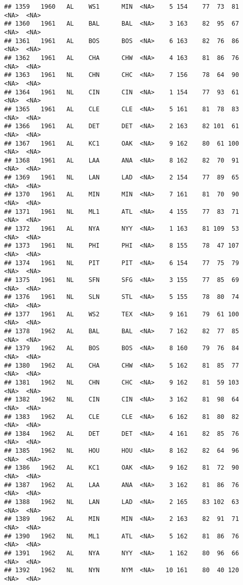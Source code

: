 \documentclass[]{article}
\begin{document}
\begin{verbatim}
## 1359   1960   AL    WS1      MIN  <NA>    5 154    77  73  81   <NA>  <NA>
## 1360   1961   AL    BAL      BAL  <NA>    3 163    82  95  67   <NA>  <NA>
## 1361   1961   AL    BOS      BOS  <NA>    6 163    82  76  86   <NA>  <NA>
## 1362   1961   AL    CHA      CHW  <NA>    4 163    81  86  76   <NA>  <NA>
## 1363   1961   NL    CHN      CHC  <NA>    7 156    78  64  90   <NA>  <NA>
## 1364   1961   NL    CIN      CIN  <NA>    1 154    77  93  61   <NA>  <NA>
## 1365   1961   AL    CLE      CLE  <NA>    5 161    81  78  83   <NA>  <NA>
## 1366   1961   AL    DET      DET  <NA>    2 163    82 101  61   <NA>  <NA>
## 1367   1961   AL    KC1      OAK  <NA>    9 162    80  61 100   <NA>  <NA>
## 1368   1961   AL    LAA      ANA  <NA>    8 162    82  70  91   <NA>  <NA>
## 1369   1961   NL    LAN      LAD  <NA>    2 154    77  89  65   <NA>  <NA>
## 1370   1961   AL    MIN      MIN  <NA>    7 161    81  70  90   <NA>  <NA>
## 1371   1961   NL    ML1      ATL  <NA>    4 155    77  83  71   <NA>  <NA>
## 1372   1961   AL    NYA      NYY  <NA>    1 163    81 109  53   <NA>  <NA>
## 1373   1961   NL    PHI      PHI  <NA>    8 155    78  47 107   <NA>  <NA>
## 1374   1961   NL    PIT      PIT  <NA>    6 154    77  75  79   <NA>  <NA>
## 1375   1961   NL    SFN      SFG  <NA>    3 155    77  85  69   <NA>  <NA>
## 1376   1961   NL    SLN      STL  <NA>    5 155    78  80  74   <NA>  <NA>
## 1377   1961   AL    WS2      TEX  <NA>    9 161    79  61 100   <NA>  <NA>
## 1378   1962   AL    BAL      BAL  <NA>    7 162    82  77  85   <NA>  <NA>
## 1379   1962   AL    BOS      BOS  <NA>    8 160    79  76  84   <NA>  <NA>
## 1380   1962   AL    CHA      CHW  <NA>    5 162    81  85  77   <NA>  <NA>
## 1381   1962   NL    CHN      CHC  <NA>    9 162    81  59 103   <NA>  <NA>
## 1382   1962   NL    CIN      CIN  <NA>    3 162    81  98  64   <NA>  <NA>
## 1383   1962   AL    CLE      CLE  <NA>    6 162    81  80  82   <NA>  <NA>
## 1384   1962   AL    DET      DET  <NA>    4 161    82  85  76   <NA>  <NA>
## 1385   1962   NL    HOU      HOU  <NA>    8 162    82  64  96   <NA>  <NA>
## 1386   1962   AL    KC1      OAK  <NA>    9 162    81  72  90   <NA>  <NA>
## 1387   1962   AL    LAA      ANA  <NA>    3 162    81  86  76   <NA>  <NA>
## 1388   1962   NL    LAN      LAD  <NA>    2 165    83 102  63   <NA>  <NA>
## 1389   1962   AL    MIN      MIN  <NA>    2 163    82  91  71   <NA>  <NA>
## 1390   1962   NL    ML1      ATL  <NA>    5 162    81  86  76   <NA>  <NA>
## 1391   1962   AL    NYA      NYY  <NA>    1 162    80  96  66   <NA>  <NA>
## 1392   1962   NL    NYN      NYM  <NA>   10 161    80  40 120   <NA>  <NA>

\end{verbatim}
\end{document}
